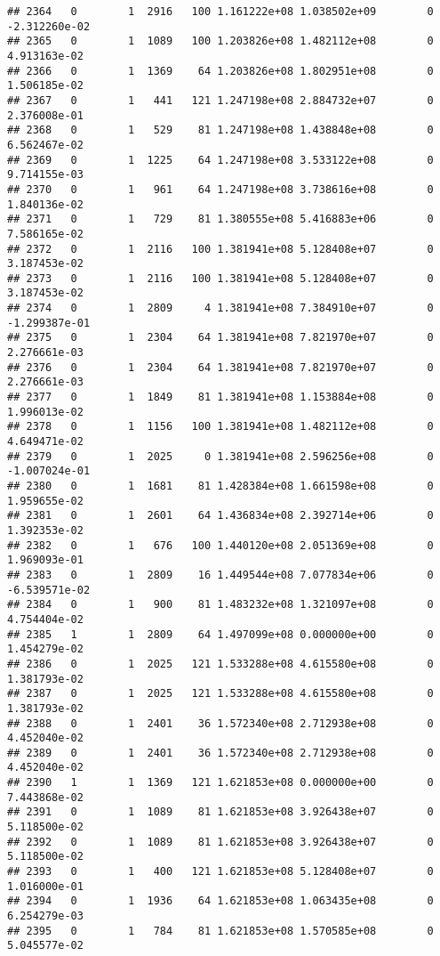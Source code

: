 \documentclass[
]{article}
\begin{document}
\begin{enumerate}
\begin{verbatim}
## 2364   0        1  2916   100 1.161222e+08 1.038502e+09        0 -2.312260e-02
## 2365   0        1  1089   100 1.203826e+08 1.482112e+08        0  4.913163e-02
## 2366   0        1  1369    64 1.203826e+08 1.802951e+08        0  1.506185e-02
## 2367   0        1   441   121 1.247198e+08 2.884732e+07        0  2.376008e-01
## 2368   0        1   529    81 1.247198e+08 1.438848e+08        0  6.562467e-02
## 2369   0        1  1225    64 1.247198e+08 3.533122e+08        0  9.714155e-03
## 2370   0        1   961    64 1.247198e+08 3.738616e+08        0  1.840136e-02
## 2371   0        1   729    81 1.380555e+08 5.416883e+06        0  7.586165e-02
## 2372   0        1  2116   100 1.381941e+08 5.128408e+07        0  3.187453e-02
## 2373   0        1  2116   100 1.381941e+08 5.128408e+07        0  3.187453e-02
## 2374   0        1  2809     4 1.381941e+08 7.384910e+07        0 -1.299387e-01
## 2375   0        1  2304    64 1.381941e+08 7.821970e+07        0  2.276661e-03
## 2376   0        1  2304    64 1.381941e+08 7.821970e+07        0  2.276661e-03
## 2377   0        1  1849    81 1.381941e+08 1.153884e+08        0  1.996013e-02
## 2378   0        1  1156   100 1.381941e+08 1.482112e+08        0  4.649471e-02
## 2379   0        1  2025     0 1.381941e+08 2.596256e+08        0 -1.007024e-01
## 2380   0        1  1681    81 1.428384e+08 1.661598e+08        0  1.959655e-02
## 2381   0        1  2601    64 1.436834e+08 2.392714e+06        0  1.392353e-02
## 2382   0        1   676   100 1.440120e+08 2.051369e+08        0  1.969093e-01
## 2383   0        1  2809    16 1.449544e+08 7.077834e+06        0 -6.539571e-02
## 2384   0        1   900    81 1.483232e+08 1.321097e+08        0  4.754404e-02
## 2385   1        1  2809    64 1.497099e+08 0.000000e+00        0  1.454279e-02
## 2386   0        1  2025   121 1.533288e+08 4.615580e+08        0  1.381793e-02
## 2387   0        1  2025   121 1.533288e+08 4.615580e+08        0  1.381793e-02
## 2388   0        1  2401    36 1.572340e+08 2.712938e+08        0  4.452040e-02
## 2389   0        1  2401    36 1.572340e+08 2.712938e+08        0  4.452040e-02
## 2390   1        1  1369   121 1.621853e+08 0.000000e+00        0  7.443868e-02
## 2391   0        1  1089    81 1.621853e+08 3.926438e+07        0  5.118500e-02
## 2392   0        1  1089    81 1.621853e+08 3.926438e+07        0  5.118500e-02
## 2393   0        1   400   121 1.621853e+08 5.128408e+07        0  1.016000e-01
## 2394   0        1  1936    64 1.621853e+08 1.063435e+08        0  6.254279e-03
## 2395   0        1   784    81 1.621853e+08 1.570585e+08        0  5.045577e-02

\end{verbatim}
\end{enumerate}
\end{document}
